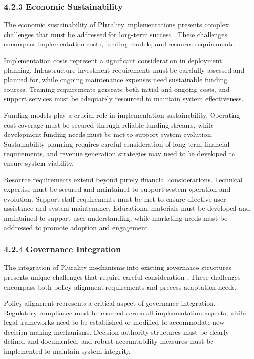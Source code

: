 \hypertarget{economic-sustainability}{%
\subsubsection{4.2.3 Economic Sustainability}\label{economic-sustainability}}

The economic sustainability of Plurality implementations presents complex challenges that must be addressed for long-term success \citep{buterin2019flexible}. These challenges encompass implementation costs, funding models, and resource requirements.

Implementation costs represent a significant consideration in deployment planning. Infrastructure investment requirements must be carefully assessed and planned for, while ongoing maintenance expenses need sustainable funding sources. Training requirements generate both initial and ongoing costs, and support services must be adequately resourced to maintain system effectiveness.

Funding models play a crucial role in implementation sustainability. Operating cost coverage must be secured through reliable funding streams, while development funding needs must be met to support system evolution. Sustainability planning requires careful consideration of long-term financial requirements, and revenue generation strategies may need to be developed to ensure system viability.

Resource requirements extend beyond purely financial considerations. Technical expertise must be secured and maintained to support system operation and evolution. Support staff requirements must be met to ensure effective user assistance and system maintenance. Educational materials must be developed and maintained to support user understanding, while marketing needs must be addressed to promote adoption and engagement.

\hypertarget{governance-integration}{%
\subsubsection{4.2.4 Governance Integration}\label{governance-integration}}

The integration of Plurality mechanisms into existing governance structures presents unique challenges that require careful consideration \citep{vtaiwan2023}. These challenges encompass both policy alignment requirements and process adaptation needs.

Policy alignment represents a critical aspect of governance integration. Regulatory compliance must be ensured across all implementation aspects, while legal frameworks need to be established or modified to accommodate new decision-making mechanisms. Decision authority structures must be clearly defined and documented, and robust accountability measures must be implemented to maintain system integrity.

